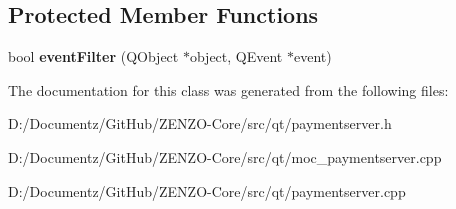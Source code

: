 \subsection*{Protected Member Functions}
\begin{DoxyCompactItemize}
\item 
\mbox{\label{class_payment_server_af795e3c318556c833792e530b279efc9}} 
bool {\bfseries event\+Filter} (Q\+Object $\ast$object, Q\+Event $\ast$event)
\end{DoxyCompactItemize}


The documentation for this class was generated from the following files\+:\begin{DoxyCompactItemize}
\item 
D\+:/\+Documentz/\+Git\+Hub/\+Z\+E\+N\+Z\+O-\/\+Core/src/qt/paymentserver.\+h\item 
D\+:/\+Documentz/\+Git\+Hub/\+Z\+E\+N\+Z\+O-\/\+Core/src/qt/moc\+\_\+paymentserver.\+cpp\item 
D\+:/\+Documentz/\+Git\+Hub/\+Z\+E\+N\+Z\+O-\/\+Core/src/qt/paymentserver.\+cpp\end{DoxyCompactItemize}

